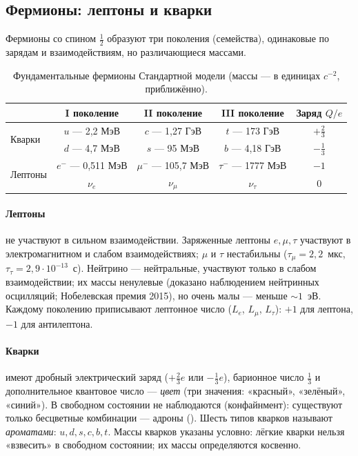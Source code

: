\subsection{Фермионы: лептоны и кварки}

Фермионы со спином $\frac12$ образуют три поколения (семейства), одинаковые по зарядам и взаимодействиям,
но различающиеся массами.

\begin{table}[htbp]
\centering
\small
\caption{Фундаментальные фермионы Стандартной модели (массы — в единицах $c^{-2}$, приближённо).}
\label{tab:14:fermions}
\begin{tabular}{@{}lcccc@{}}
\toprule
& I поколение & II поколение & III поколение & Заряд $Q/e$ \\
\midrule
\multirow{2}{*}{Кварки}
 & $u$ — 2,2 МэВ & $c$ — 1,27 ГэВ & $t$ — 173 ГэВ & $+\tfrac23$ \\
 & $d$ — 4,7 МэВ & $s$ — 95 МэВ & $b$ — 4,18 ГэВ & $-\tfrac13$ \\
\midrule
\multirow{2}{*}{Лептоны}
 & $e^-$ — 0,511 МэВ & $\mu^-$ — 105,7 МэВ & $\tau^-$ — 1777 МэВ & $-1$ \\
 & $\nu_e$ & $\nu_\mu$ & $\nu_\tau$ & $0$ \\
\bottomrule
\end{tabular}
\end{table}

\paragraph{Лептоны} не участвуют в сильном взаимодействии. Заряженные лептоны $e,\mu,\tau$ участвуют в
электромагнитном и слабом взаимодействиях; $\mu$ и $\tau$ нестабильны ($\tau_\mu=2{,}2$~мкс, $\tau_\tau=2{,}9\cdot10^{-13}$~с).
Нейтрино — нейтральные, участвуют только в слабом взаимодействии; их массы ненулевые (доказано
наблюдением нейтринных осцилляций; Нобелевская премия 2015), но очень малы — меньше $\sim1$~эВ. Каждому
поколению приписывают лептонное число ($L_e$, $L_\mu$, $L_\tau$): $+1$ для лептона, $-1$ для антилептона.

\paragraph{Кварки} имеют дробный электрический заряд ($+\frac23e$ или $-\frac13e$), барионное число $\frac13$ и
дополнительное квантовое число — \emph{цвет} (три значения: «красный», «зелёный», «синий»). В свободном
состоянии не наблюдаются (конфайнмент): существуют только бесцветные комбинации — адроны ().
Шесть типов кварков называют \emph{ароматами}: $u,d,s,c,b,t$. Массы кварков указаны условно: лёгкие кварки
нельзя «взвесить» в свободном состоянии; их массы определяются косвенно.

